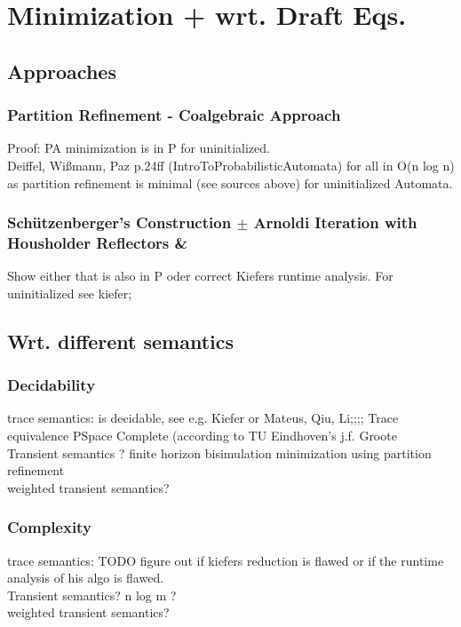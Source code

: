     \section{Minimization + wrt. Draft Eqs.}
        \begin{definition}
         
        \end{definition}
        \subsection{Approaches}
            \subsubsection{Partition Refinement - Coalgebraic Approach}
            Proof: PA minimization is in P for uninitialized. \\
            Deiffel, Wißmann, Paz p.24ff (IntroToProbabilisticAutomata)
            for all in O(n log n) as partition refinement is minimal (see sources above) for uninitialized Automata. \\
        
            \subsubsection{Schützenberger's Construction $\pm$ Arnoldi Iteration with Housholder Reflectors \& }
            Show either that is also in P oder correct Kiefers runtime analysis.
            For uninitialized see kiefer; 
            
        \subsection{Wrt. different semantics}
            \subsubsection{Decidability}
            trace semantics: is decidable, see e.g. Kiefer or Mateus, Qiu, Li;;;; Trace equivalence PSpace Complete (according to TU Eindhoven's j.f. Groote \\
            Transient semantics ? finite horizon bisimulation minimization using partition refinement \\
            weighted transient semantics? \\
            
            \subsubsection{Complexity}
            trace semantics: TODO figure out if kiefers reduction is flawed or if the runtime analysis of his algo is flawed. \\
            Transient semantics? n log m ?\\
            weighted transient semantics? \\
            
    
